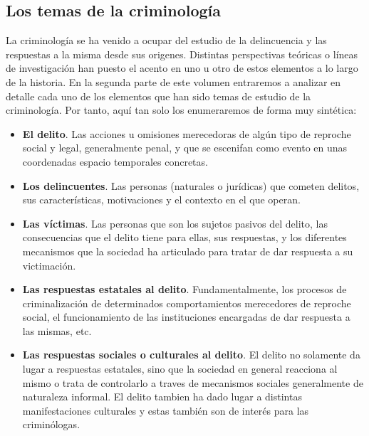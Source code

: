 \documentclass[
  spanish,
  letterpaper,
  DIV=11,
  numbers=noendperiod]{scrreprt}
\begin{document}
\subsection{Los temas de la
criminología}\label{los-temas-de-la-criminologuxeda}

La criminología se ha venido a ocupar del estudio de la delincuencia y
las respuestas a la misma desde sus origenes. Distintas perspectivas
teóricas o líneas de investigación han puesto el acento en uno u otro de
estos elementos a lo largo de la historia. En la segunda parte de este
volumen entraremos a analizar en detalle cada uno de los elementos que
han sido temas de estudio de la criminología. Por tanto, aquí tan solo
los enumeraremos de forma muy sintética:

\begin{itemize}
\item
  \textbf{El delito}. Las acciones u omisiones merecedoras de algún tipo
  de reproche social y legal, generalmente penal, y que se escenifan
  como evento en unas coordenadas espacio temporales concretas.
\item
  \textbf{Los delincuentes}. Las personas (naturales o jurídicas) que
  cometen delitos, sus características, motivaciones y el contexto en el
  que operan.
\item
  \textbf{Las víctimas}. Las personas que son los sujetos pasivos del
  delito, las consecuencias que el delito tiene para ellas, sus
  respuestas, y los diferentes mecanismos que la sociedad ha articulado
  para tratar de dar respuesta a su victimación.
\item
  \textbf{Las respuestas estatales al delito}. Fundamentalmente, los
  procesos de criminalización de determinados comportamientos
  merecedores de reproche social, el funcionamiento de las instituciones
  encargadas de dar respuesta a las mismas, etc.
\item
  \textbf{Las respuestas sociales o culturales al delito}. El delito no
  solamente da lugar a respuestas estatales, sino que la sociedad en
  general reacciona al mismo o trata de controlarlo a traves de
  mecanismos sociales generalmente de naturaleza informal. El delito
  tambien ha dado lugar a distintas manifestaciones culturales y estas
  también son de interés para las criminólogas.
\end{itemize}
\end{document}
